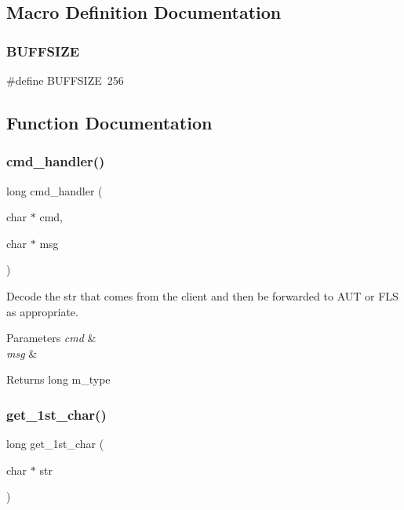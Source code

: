 \subsection{Macro Definition Documentation}
\mbox{\label{prueba_8c_a39912bfe2a55f30e269196f9141d845d}} 
\subsubsection{B\+U\+F\+F\+S\+I\+ZE}
{\footnotesize\ttfamily \#define B\+U\+F\+F\+S\+I\+ZE~256}



\subsection{Function Documentation}
\mbox{\label{prueba_8c_a9fab57195d50c5f2b55f2744232ad64d}} 
\subsubsection{cmd\+\_\+handler()}
{\footnotesize\ttfamily long cmd\+\_\+handler (\begin{DoxyParamCaption}\item[{char $\ast$}]{cmd,  }\item[{char $\ast$}]{msg }\end{DoxyParamCaption})}



Decode the str that comes from the client and then be forwarded to A\+UT or F\+LS as appropriate. 


\begin{DoxyParams}{Parameters}
{\em cmd} & \\
\hline
{\em msg} & \\
\hline
\end{DoxyParams}
\begin{DoxyReturn}{Returns}
long m\+\_\+type 
\end{DoxyReturn}
\mbox{\label{prueba_8c_a224345045f1250d5768d42d8cc9e3dab}} 
\subsubsection{get\+\_\+1st\+\_\+char()}
{\footnotesize\ttfamily long get\+\_\+1st\+\_\+char (\begin{DoxyParamCaption}\item[{char $\ast$}]{str }\end{DoxyParamCaption})}



